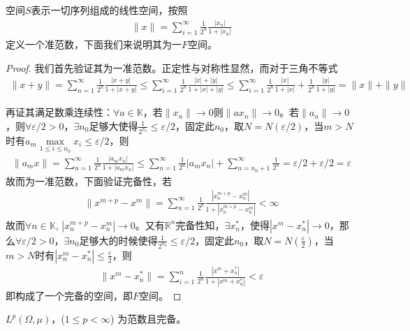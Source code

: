 \begin{example}
    空间$S$表示一切序列组成的线性空间，按照
    \begin{align*}
        \|x\| = \sum\limits_{i=1}^{\infty} \frac{1}{2^n} \frac{|x_n|}{1+|x_n|}
    \end{align*}
    定义一个准范数，下面我们来说明其为一$F$空间。
\end{example}
\begin{proof}
    我们首先验证其为一准范数。正定性与对称性显然，而对于三角不等式
    \begin{align*}
        \|x+y\| = \sum\limits_{n=1}^{\infty} \frac{1}{2^n} \frac{|x+y|}{1+|x+y|} \le \sum\limits_{i=1}^{\infty}\frac{1}{2^n} \frac{|x| + |y|}{1+|x|+|y|} \le \sum\limits_{i=1}^{\infty} \frac{1}{2^n}\frac{|x|}{1+|x|} + \frac{1}{2^n}\frac{|y|}{1+|y|}  = \|x\| + \| y\|
    \end{align*}

    再证其满足数乘连续性：$\forall a\in\mathbb{K}$，若$\|x_n\|\to 0$则$\|ax_n\|\to 0$。若$\|a_n\|\to 0$，则$\forall\varepsilon/2>0$，$\exists n_0$足够大使得$\frac{1}{2^{x_0}}\le \varepsilon/2$，固定此$n_0$，取$N = N(\varepsilon/2)$，当$m>N$时有$a_m\max\limits_{1\le i\le n_0} x_i\le \varepsilon/2$，则
    \begin{align*}
        \|a_mx\| = \sum\limits_{n=1}^{\infty} \frac{1}{2^n} \frac{|a_mx_n|}{1+|a_mx_n|}\le \sum\limits_{n=1}^{\infty} \frac{1}{2^n}|a_mx_n| + \sum\limits_{n=n_0+1}^{\infty} \frac{1}{2^n} = \varepsilon/2 + \varepsilon/2 = \varepsilon    
    \end{align*}
    故而为一准范数，下面验证完备性，若
    \begin{align*}
        \|x^{m+p} - x^m\| = \sum\limits_{n=1}^{\infty} \frac{1}{2^n} \frac{|x_n^{m+p} - x_n^m|}{1 + |x_n^{m+p} - x_n^m|} < \infty
    \end{align*}
    故而$\forall n\in\mathbb{K}$, $|x_n^{m+p} - x_n^m| \to 0$。又有$\mathbb{R}^n$完备性知，$\exists x^*_n$，使得$|x^m - x_n^*| \to 0$，那么$\forall \varepsilon/2 > 0$，$\exists n_0$足够大的时候使得$\frac{1}{2^{n_0}}\le \varepsilon/2$，固定此$n_0$，取$N = N(\frac{\varepsilon}{2})$，当$m>N$时有$|x_n^m - x_n^*| \le\frac{\varepsilon}{2}$，则
    \begin{align*}
        \|x^m - x_n^*\| = \sum\limits_{i=1}^n \frac{1}{2^n} \frac{|x^m+x^*_n|}{1+|x^m+x_n^*|} < \varepsilon
    \end{align*}
    即构成了一个完备的空间，即$F$空间。
\end{proof}

\begin{example}
    $L^p(\Omega, \mu)$，($1\le p<\infty$) 为范数且完备。
\end{example}

